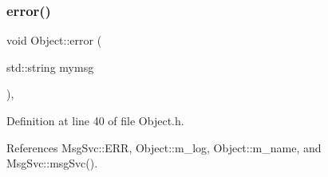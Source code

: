 \subsubsection{\texorpdfstring{error()}{error()}\hspace{0.1cm}{\footnotesize\ttfamily [1/2]}}
{\footnotesize\ttfamily void Object\+::error (\begin{DoxyParamCaption}\item[{std\+::string}]{mymsg }\end{DoxyParamCaption})\hspace{0.3cm}{\ttfamily [inline]}, {\ttfamily [inherited]}}



Definition at line 40 of file Object.\+h.



References Msg\+Svc\+::\+E\+RR, Object\+::m\+\_\+log, Object\+::m\+\_\+name, and Msg\+Svc\+::msg\+Svc().



